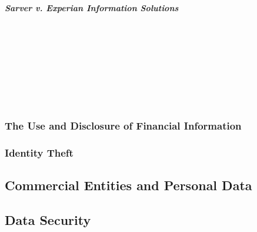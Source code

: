 \paragraph{\emph{Sarver v. Experian Information Solutions}}

~\\\\\\\\\\\\\\

\subsubsection{The Use and Disclosure of Financial Information}


\subsubsection{Identity Theft}


\subsection{Commercial Entities and Personal Data}


\subsection{Data Security}

